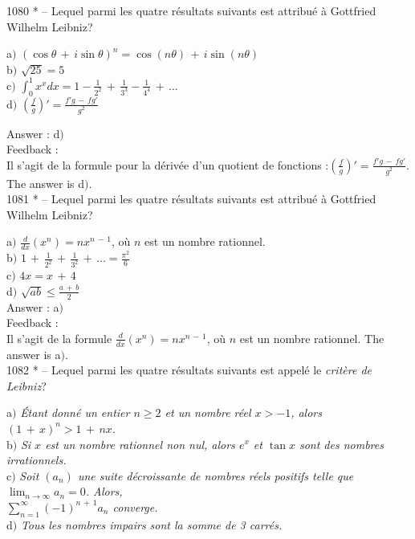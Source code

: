 \documentclass[letterpaper, 12pt]{article}
\begin{document}
1080 * -- Lequel parmi les quatre r\'esultats suivants est
attribu\'e \`a Gottfried Wilhelm Leibniz?

a$)$
$(\cos\theta\,+\,i\sin\theta)^n=\cos(n\theta)\,+\,i\sin(n\theta)$
\\ [2mm] b$)$ $\sqrt{25}=5$ \\ [3 mm] c$)$
$\int_0^1x^xdx=1-\frac1{2^2}\,+\,\frac1{3^3}-\frac1{4^4}\,+\,\ldots$ \\
[2mm] d$)$ $\left(\frac fg\right)'=\frac{f'g\,-\,fg'}{g^2}$

Answer : d$)$\\

Feedback : \\
Il s'agit de la formule pour la d\'eriv\'ee d'un quotient de
fonctions :$\left(\frac fg\right)'=\frac{f'g\,-\,fg'}{g^2}$.
The answer is d$)$.\\

1081 * -- Lequel parmi les quatre r\'esultats suivants est
attribu\'e \`a Gottfried Wilhelm Leibniz?

a$)$ $\frac d{dx}(x^n)=nx^{n\,-\,1}$, o\`u $n$ est un nombre
rationnel.
\\ [2mm] b$)$ $1\,+\,\frac1{2^2}\,+\,\frac1{3^2}\,+\,\ldots=\frac{\pi^2}6$
\\ [3 mm] c$)$ $4x=x\,+\,4$ \\ [2mm]
d$)$ $\sqrt{ab}\le\frac{a\,+\,b}2$\\

Answer : a$)$\\

Feedback : \\
Il s'agit de la formule $\frac d{dx}(x^n)=nx^{n\,-\,1}$, o\`u $n$
est un nombre rationnel.
The answer is a$)$.\\

1082 * -- Lequel parmi les quatre r\'esultats suivants est appel\'e
le {\sl crit\`ere de Leibniz}?

a$)$ {\sl \'Etant donn\'e un entier $n\ge2$ et un nombre r\'eel $x>-1$,
alors $(1\,+\,x)^n>1\,+\,nx$.} \\[2mm]
b$)$ {\sl Si $x$ est un nombre rationnel non nul, alors $e^x$ et $\tan x$
sont des nombres irrationnels.} \\[2mm]
c$)$ {\sl Soit $(a_n)$ une suite d\'ecroissante de nombres r\'eels positifs
telle que $\lim_{n\to\infty}a_n=0$.  Alors, \\[2mm]
$\sum_{n=1}^{\infty}(-1)^{n\,+\,1}a_n$ converge.} \\[2mm]
d$)$ {\sl Tous les nombres impairs sont la somme de 3 carr\'es.}
\end{document}
